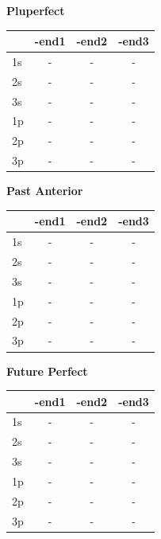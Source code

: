\documentclass{book}
\begin{document}
\vspace{0.5cm}
\noindent
\begin{minipage}{0.32\textwidth}
\centering
\textbf{Pluperfect} \\ \vspace{0.1cm}
\begin{tabular}{lccc} \toprule & -end1 & -end2 & -end3 \\ \midrule 1s & - & - & - \\ 2s & - & - & - \\ 3s & - & - & - \\ 1p & - & - & - \\ 2p & - & - & - \\ 3p & - & - & - \\ \bottomrule \end{tabular}
\end{minipage}\hfill
\begin{minipage}{0.32\textwidth}
\centering
\textbf{Past Anterior} \\ \vspace{0.1cm}
\begin{tabular}{lccc} \toprule & -end1 & -end2 & -end3 \\ \midrule 1s & - & - & - \\ 2s & - & - & - \\ 3s & - & - & - \\ 1p & - & - & - \\ 2p & - & - & - \\ 3p & - & - & - \\ \bottomrule \end{tabular}
\end{minipage}\hfill
\begin{minipage}{0.32\textwidth}
\centering
\textbf{Future Perfect} \\ \vspace{0.1cm}
\begin{tabular}{lccc} \toprule & -end1 & -end2 & -end3 \\ \midrule 1s & - & - & - \\ 2s & - & - & - \\ 3s & - & - & - \\ 1p & - & - & - \\ 2p & - & - & - \\ 3p & - & - & - \\ \bottomrule \end{tabular}
\end{minipage}
\end{document}
